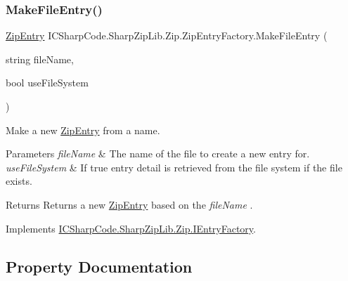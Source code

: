 \subsubsection{\texorpdfstring{Make\+File\+Entry()}{MakeFileEntry()}\hspace{0.1cm}{\footnotesize\ttfamily [2/2]}}
{\footnotesize\ttfamily \hyperlink{class_i_c_sharp_code_1_1_sharp_zip_lib_1_1_zip_1_1_zip_entry}{Zip\+Entry} I\+C\+Sharp\+Code.\+Sharp\+Zip\+Lib.\+Zip.\+Zip\+Entry\+Factory.\+Make\+File\+Entry (\begin{DoxyParamCaption}\item[{string}]{file\+Name,  }\item[{bool}]{use\+File\+System }\end{DoxyParamCaption})\hspace{0.3cm}{\ttfamily [inline]}}



Make a new \hyperlink{class_i_c_sharp_code_1_1_sharp_zip_lib_1_1_zip_1_1_zip_entry}{Zip\+Entry} from a name. 


\begin{DoxyParams}{Parameters}
{\em file\+Name} & The name of the file to create a new entry for.\\
\hline
{\em use\+File\+System} & If true entry detail is retrieved from the file system if the file exists.\\
\hline
\end{DoxyParams}
\begin{DoxyReturn}{Returns}
Returns a new \hyperlink{class_i_c_sharp_code_1_1_sharp_zip_lib_1_1_zip_1_1_zip_entry}{Zip\+Entry} based on the {\itshape file\+Name} .
\end{DoxyReturn}


Implements \hyperlink{interface_i_c_sharp_code_1_1_sharp_zip_lib_1_1_zip_1_1_i_entry_factory_a576fc2a664ce3d629d04d12f1b964d87}{I\+C\+Sharp\+Code.\+Sharp\+Zip\+Lib.\+Zip.\+I\+Entry\+Factory}.



\subsection{Property Documentation}
\mbox{\label{class_i_c_sharp_code_1_1_sharp_zip_lib_1_1_zip_1_1_zip_entry_factory_aeb39fdaf985746bbdba661be7850693a}} 
